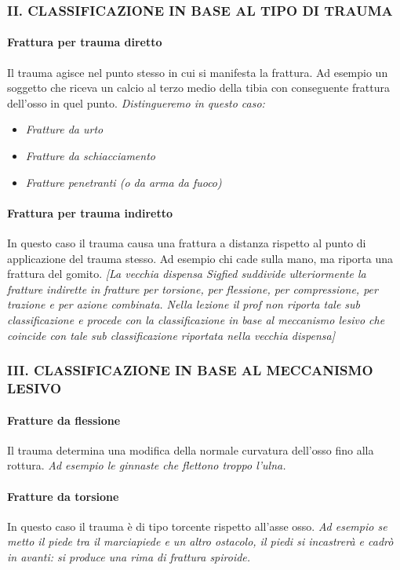 \subsubsection{II. CLASSIFICAZIONE IN BASE AL TIPO DI TRAUMA}

\paragraph{Frattura per trauma diretto}
Il trauma agisce nel punto stesso in cui si manifesta la frattura. Ad esempio un soggetto che riceva un calcio al terzo medio della tibia con conseguente frattura dell'osso in quel punto. \emph{Distingueremo in questo caso:}

\begin{itemize}
\item
  \emph{Fratture da urto}
\item
  \emph{Fratture da schiacciamento}
\item
  \emph{Fratture penetranti (o da arma da fuoco)}
\end{itemize}

\paragraph{Frattura per trauma indiretto}
In questo caso il trauma causa una frattura a distanza rispetto al punto di applicazione del trauma stesso. Ad esempio chi cade sulla mano, ma riporta una frattura del gomito. \emph{{[}La vecchia dispensa Sigfied suddivide ulteriormente la fratture indirette in fratture per torsione, per flessione, per compressione, per trazione e per azione combinata. Nella lezione il prof non riporta tale sub classificazione e procede con la classificazione in base al meccanismo lesivo che coincide con tale sub classificazione riportata nella vecchia dispensa{]}}


\subsubsection{III. CLASSIFICAZIONE IN BASE AL MECCANISMO LESIVO}

\paragraph{Fratture da flessione}
Il trauma determina una modifica della normale curvatura dell'osso fino alla rottura. \emph{Ad esempio le ginnaste che flettono troppo l'ulna.}
\paragraph{Fratture da torsione}
In questo caso il trauma è di tipo torcente rispetto all'asse osso. \emph{Ad esempio se metto il piede tra il marciapiede e un altro ostacolo, il piedi si incastrerà e cadrò in avanti: si produce una rima di frattura spiroide.}
